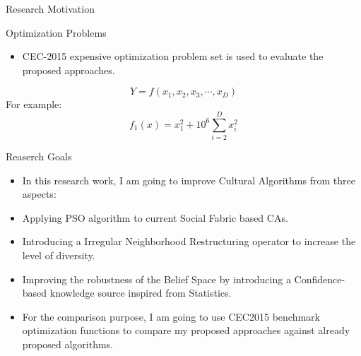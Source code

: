 \documentclass[table]{beamer}
\begin{document}
	\begin{frame}{Research Motivation}
		\begin{block}{Optimization Problems}
			\begin{itemize}
				\justifying
				\item CEC-2015 expensive optimization problem set is used to evaluate the proposed approaches. \cite{chen2014problem}
			\end{itemize}
		\end{block}
		\begin{equation}
		Y=f(x_{1}, x_{2}, x_{3}, \cdots, x_{D})
		\end{equation}
		For example: 
		\begin{equation}
		f_{1}(x)=x_{1}^{2}+10^{6}\sum_{i=2}^{D}x_{i}^2
		\end{equation}
		
	\end{frame}
	
	\begin{frame}{Reaserch Goals}
		\begin{block}{}
			\begin{itemize}
				\justifying
				\item In this research work, I am going to improve Cultural Algorithms from three aspects:
				\item Applying PSO algorithm to current Social Fabric based CAs.
				\item Introducing a Irregular Neighborhood Restructuring operator to increase the level of diversity.
				\item Improving the robustness of the Belief Space by introducing a Confidence-based knowledge source inspired from Statistics.
				\item For the comparison purpose, I am going to use CEC2015 benchmark optimization functions to compare my proposed approaches against already proposed algorithms.
			\end{itemize}
		\end{block}
	\end{frame}
	
\end{document}
